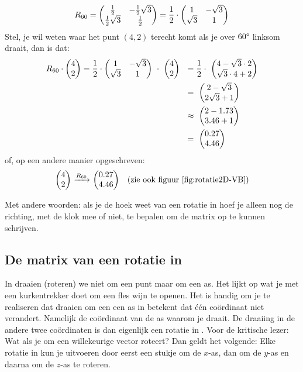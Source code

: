 \[
	R_{60} = \begin{pmatrix} \frac{1}{2} & -\frac{1}{2} \sqrt{3} \\ \frac{1}{2}\sqrt{3} & \frac{1}{2} \end{pmatrix} 
           = \frac{1}{2} \cdot \begin{pmatrix} 1 & -\sqrt{3} \\ \sqrt{3} & 1 \end{pmatrix}
\]
Stel, je wil weten waar het punt $(4,2)$ terecht komt als je over $60\degree$ linksom draait, dan is dat:
\begin{align*}
    R_{60} \cdot  \mattwee{4}{2} =\frac{1}{2} \cdot \mattwee{1 & -\sqrt{3}}{\sqrt{3} & 1} \ \cdot\ \mattwee{4}{2} \ \ 
        &= \frac{1}{2}\cdot\ \mattwee{4 -\sqrt{3}\cdot 2}{\sqrt{3}\cdot 4 + 2} \\ 
        &=\ \mattwee{2-\sqrt{3}}{2\sqrt{3}+1} \\ 
        &\approx\ \mattwee{2-1.73}{3.46+1} \\ 
        &=\ \mattwee{0.27}{4.46}  
\end{align*}
of, op een andere manier opgeschreven: 
\[
    \vectwee{4}{2} \ \xrightarrow{R_{60}} \ \vectwee{0.27}{4.46} \quad \text{(zie ook figuur \ref{fig:rotatie2D-VB})}
\]


 
Met andere woorden: als je de hoek weet van een rotatie in \RT hoef je alleen nog de richting, met de klok mee of niet,  te bepalen om de matrix op te kunnen schrijven.

\subsection{De matrix van een rotatie in \RD}
In \RD draaien (roteren) we niet om een punt maar om een as. Het lijkt op wat je met een kurkentrekker doet om een fles wijn te openen. Het is handig om je te realiseren dat draaien om een een as in \RD betekent dat één coördinaat niet verandert. Namelijk de coördinaat van de as waarom je draait.  De draaiing in de andere twee coördinaten is dan eigenlijk een rotatie in \RT. Voor de kritische lezer: Wat als je om een willekeurige vector roteert? Dan geldt het volgende: Elke rotatie in \RD kun je uitvoeren door eerst een stukje om de $x$-as, dan om de $y$-as en daarna om de $z$-as te roteren.


